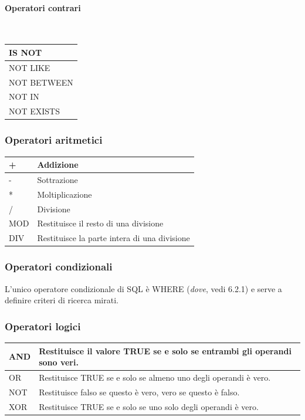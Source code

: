 \documentclass[a4paper]{article}
\begin{document}
\paragraph{Operatori contrari} \ \medskip\\
\begin{tabular}{|l|}
  \hline
  IS NOT\\
  \hline
  NOT LIKE\\
  \hline
  NOT BETWEEN\\
  \hline
  NOT IN\\
  \hline
  NOT EXISTS\\
  \hline
\end{tabular}

\subsubsection{Operatori aritmetici}
\begin{tabularx}{350pt}{|l|X|}
  \hline
  + & Addizione\\
  \hline
  - & Sottrazione\\
  \hline
  * & Moltiplicazione\\
  \hline
  / & Divisione\\
  \hline
  MOD & Restituisce il resto di una divisione\\
  \hline
  DIV & Restituisce la parte intera di una divisione\\
  \hline
\end{tabularx}

\subsubsection{Operatori condizionali}
L'unico operatore condizionale di SQL è WHERE (\emph{dove}, vedi 6.2.1) e serve a definire criteri di ricerca mirati.

\subsubsection{Operatori logici}
\begin{tabularx}{350pt}{|l|X|}
  \hline
  AND & Restituisce il valore TRUE se e solo se entrambi gli operandi sono veri.\\
  \hline
  OR & Restituisce TRUE se e solo se almeno uno degli operandi è vero.\\
  \hline
  NOT & Restituisce falso se questo è vero, vero se questo è falso.\\
  \hline
  XOR & Restituisce TRUE se e solo se uno solo degli operandi è vero.\\
  \hline
\end{tabularx}
\end{document}
